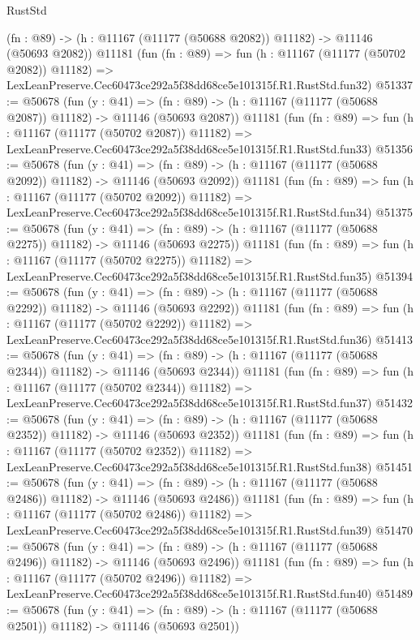 \begin{lexlean}{RustStd}
\begin{coremodule}
    (fn : @89) -> (h : @11167 (@11177 (@50688 @2082)) @11182) -> @11146 (@50693 @2082))
    @11181
    (fun (fn : @89) =>
    fun (h : @11167 (@11177 (@50702 @2082)) @11182) =>
    LexLeanPreserve.Cec60473ce292a5f38dd68ce5e101315f.R1.RustStd.fun32)
@51337 := @50678
    (fun (y : @41) =>
    (fn : @89) -> (h : @11167 (@11177 (@50688 @2087)) @11182) -> @11146 (@50693 @2087))
    @11181
    (fun (fn : @89) =>
    fun (h : @11167 (@11177 (@50702 @2087)) @11182) =>
    LexLeanPreserve.Cec60473ce292a5f38dd68ce5e101315f.R1.RustStd.fun33)
@51356 := @50678
    (fun (y : @41) =>
    (fn : @89) -> (h : @11167 (@11177 (@50688 @2092)) @11182) -> @11146 (@50693 @2092))
    @11181
    (fun (fn : @89) =>
    fun (h : @11167 (@11177 (@50702 @2092)) @11182) =>
    LexLeanPreserve.Cec60473ce292a5f38dd68ce5e101315f.R1.RustStd.fun34)
@51375 := @50678
    (fun (y : @41) =>
    (fn : @89) -> (h : @11167 (@11177 (@50688 @2275)) @11182) -> @11146 (@50693 @2275))
    @11181
    (fun (fn : @89) =>
    fun (h : @11167 (@11177 (@50702 @2275)) @11182) =>
    LexLeanPreserve.Cec60473ce292a5f38dd68ce5e101315f.R1.RustStd.fun35)
@51394 := @50678
    (fun (y : @41) =>
    (fn : @89) -> (h : @11167 (@11177 (@50688 @2292)) @11182) -> @11146 (@50693 @2292))
    @11181
    (fun (fn : @89) =>
    fun (h : @11167 (@11177 (@50702 @2292)) @11182) =>
    LexLeanPreserve.Cec60473ce292a5f38dd68ce5e101315f.R1.RustStd.fun36)
@51413 := @50678
    (fun (y : @41) =>
    (fn : @89) -> (h : @11167 (@11177 (@50688 @2344)) @11182) -> @11146 (@50693 @2344))
    @11181
    (fun (fn : @89) =>
    fun (h : @11167 (@11177 (@50702 @2344)) @11182) =>
    LexLeanPreserve.Cec60473ce292a5f38dd68ce5e101315f.R1.RustStd.fun37)
@51432 := @50678
    (fun (y : @41) =>
    (fn : @89) -> (h : @11167 (@11177 (@50688 @2352)) @11182) -> @11146 (@50693 @2352))
    @11181
    (fun (fn : @89) =>
    fun (h : @11167 (@11177 (@50702 @2352)) @11182) =>
    LexLeanPreserve.Cec60473ce292a5f38dd68ce5e101315f.R1.RustStd.fun38)
@51451 := @50678
    (fun (y : @41) =>
    (fn : @89) -> (h : @11167 (@11177 (@50688 @2486)) @11182) -> @11146 (@50693 @2486))
    @11181
    (fun (fn : @89) =>
    fun (h : @11167 (@11177 (@50702 @2486)) @11182) =>
    LexLeanPreserve.Cec60473ce292a5f38dd68ce5e101315f.R1.RustStd.fun39)
@51470 := @50678
    (fun (y : @41) =>
    (fn : @89) -> (h : @11167 (@11177 (@50688 @2496)) @11182) -> @11146 (@50693 @2496))
    @11181
    (fun (fn : @89) =>
    fun (h : @11167 (@11177 (@50702 @2496)) @11182) =>
    LexLeanPreserve.Cec60473ce292a5f38dd68ce5e101315f.R1.RustStd.fun40)
@51489 := @50678
    (fun (y : @41) =>
    (fn : @89) -> (h : @11167 (@11177 (@50688 @2501)) @11182) -> @11146 (@50693 @2501))

\end{coremodule}
\end{lexlean}
